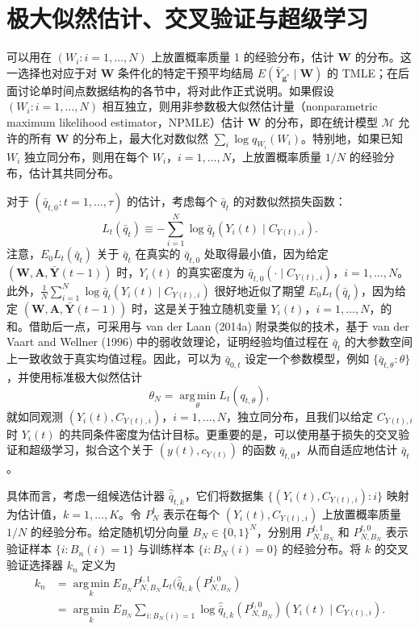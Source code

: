 \section{极大似然估计、交叉验证与超级学习}

可以用在 $(W_i:i=1,\ldots,N)$ 上放置概率质量 1 的经验分布，估计 $\mathbf W$ 的分布。这一选择也对应于对 $\mathbf W$ 条件化的特定干预平均结局 $E(\bar Y_{\mathbf g^*}\mid\mathbf W)$ 的 TMLE；在后面讨论单时间点数据结构的各节中，将对此作正式说明。如果假设 $(W_i:i=1,\ldots,N)$ 相互独立，则用非参数极大似然估计量（nonparametric maximum likelihood estimator，NPMLE）估计 $\mathbf W$ 的分布，即在统计模型 $\mathcal M$ 允许的所有 $\mathbf W$ 的分布上，最大化对数似然 $\sum_i\log q_{W_i}(W_i)$。特别地，如果已知 $W_i$ 独立同分布，则用在每个 $W_i$，$i=1,\ldots,N$，上放置概率质量 $1/N$ 的经验分布，估计其共同分布。

对于 $(\bar q_{t,0}:t=1,\ldots,\tau)$ 的估计，考虑每个 $\bar q_t$ 的对数似然损失函数：
\[
 L_t(\bar q_t)\equiv-\sum_{i=1}^N\log\bar q_t(Y_i(t)\mid C_{Y(t),i}).
\]
注意，$E_0L_t(\bar q_t)$ 关于 $\bar q_t$ 在真实的 $\bar q_{t,0}$ 处取得最小值，因为给定 $(\mathbf W,\mathbf A,\bar{\mathbf Y}(t-1))$ 时，$Y_i(t)$ 的真实密度为 $\bar q_{t,0}(\cdot\mid C_{Y(t),i})$，$i=1,\ldots,N$。此外，$\frac1N\sum_{i=1}^N\log\bar q_t(Y_i(t)\mid C_{Y(t),i})$ 很好地近似了期望 $E_0L_t(\bar q_t)$，因为给定 $(\mathbf W,\mathbf A,\bar{\mathbf Y}(t-1))$ 时，这是关于独立随机变量 $Y_i(t)$，$i=1,\ldots,N$，的和。借助后一点，可采用与 van der Laan (2014a) 附录类似的技术，基于 van der Vaart and Wellner (1996) 中的弱收敛理论，证明经验均值过程在 $\bar q_t$ 的大参数空间上一致收敛于真实均值过程。因此，可以为 $\bar q_{0,t}$ 设定一个参数模型，例如 $\{\bar q_{t,\theta}:\theta\}$，并使用标准极大似然估计
\[
 \theta_N=\operatorname*{arg\,min}_{\theta}L_t(q_{t,\theta}),
\]
就如同观测 $(Y_i(t),C_{Y(t),i})$，$i=1,\ldots,N$，独立同分布，且我们以给定 $C_{Y(t),i}$ 时 $Y_i(t)$ 的共同条件密度为估计目标。更重要的是，可以使用基于损失的交叉验证和超级学习，拟合这个关于 $(y(t),c_{Y(t)})$ 的函数 $\bar q_{t,0}$，从而自适应地估计 $\bar q_t$。

具体而言，考虑一组候选估计器 $\widehat{\bar q}_{t,k}$，它们将数据集 $\{(Y_i(t),C_{Y(t),i}):i\}$ 映射为估计值，$k=1,\ldots,K$。令 $P_N^t$ 表示在每个 $(Y_i(t),C_{Y(t),i})$ 上放置概率质量 $1/N$ 的经验分布。给定随机切分向量 $B_N\in\{0,1\}^N$，分别用 $P_{N,B_N}^{t,1}$ 和 $P_{N,B_N}^{t,0}$ 表示验证样本 $\{i:B_n(i)=1\}$ 与训练样本 $\{i:B_N(i)=0\}$ 的经验分布。将 $k$ 的交叉验证选择器 $k_n$ 定义为
\[
\begin{aligned}
 k_n&=\operatorname*{arg\,min}_kE_{B_N}P_{N,B_N}^{t,1}
       L_t(\widehat{\bar q}_{t,k}(P_{N,B_N}^{t,0})\\
 &=\operatorname*{arg\,min}_kE_{B_N}\sum_{i:B_N(i)=1}
       \log\widehat{\bar q}_{t,k}(P_{N,B_N}^{t,0})(Y_i(t)\mid C_{Y(t),i}).
\end{aligned}
\]

